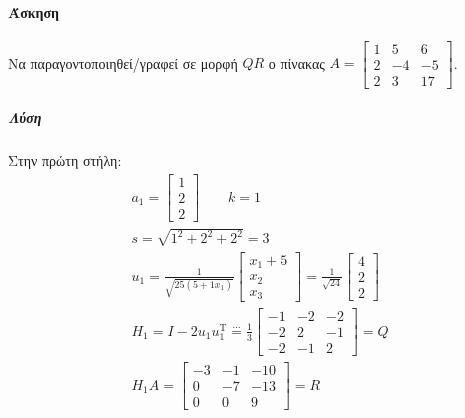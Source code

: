 \documentclass[11pt,a4paper,notitlepage,fleqn]{article}
\begin{document}
\paragraph{Άσκηση}
Να παραγοντοποιηθεί/γραφεί σε μορφή \( QR \) ο πίνακας \( A =
\left[\begin{matrix}
1&5&6\\2&-4&-5\\2&3&17
\end{matrix}\right] \).
\subparagraph{Λύση}
Στην πρώτη στήλη:
\begin{gather*}
	a_1 = \left[\begin{matrix}
	1\\2\\2
	\end{matrix}\right] \qquad k=1 \\
	s=\sqrt{1^2+2^2+2^2}=3 \\
	u_1 = \frac{1}{\sqrt{25(5+1x_1)}}\left[\begin{matrix}
	x_1+5\\x_2\\x_3
	\end{matrix}\right] = \frac{1}{\sqrt{24}}\left[\begin{matrix}
	4\\2\\2
	\end{matrix}\right] \\
	H_1 = I-2u_1u_1^{\mathrm T} \overset{\cdots}{=}
	\frac{1}{3}\left[\begin{matrix}
	-1&-2&-2\\-2&2&-1\\-2&-1&2
	\end{matrix}\right] = Q \\
	H_1A = \left[\begin{matrix}
	-3&-1&-10\\0&-7&-13\\0&0&9
	\end{matrix}\right] = R
\end{gather*}
\end{document}
